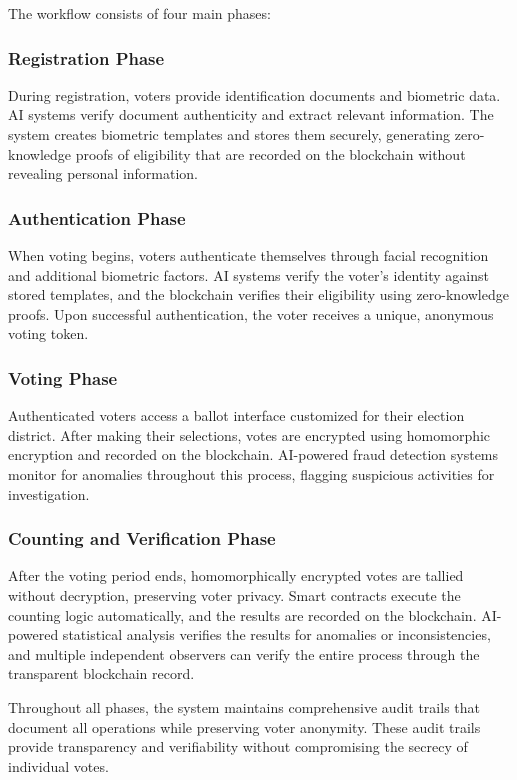 \documentclass[conference]{IEEEtran}
\begin{document}
The workflow consists of four main phases:

\subsubsection{Registration Phase}
During registration, voters provide identification documents and biometric data. AI systems verify document authenticity and extract relevant information. The system creates biometric templates and stores them securely, generating zero-knowledge proofs of eligibility that are recorded on the blockchain without revealing personal information.

\subsubsection{Authentication Phase}
When voting begins, voters authenticate themselves through facial recognition and additional biometric factors. AI systems verify the voter's identity against stored templates, and the blockchain verifies their eligibility using zero-knowledge proofs. Upon successful authentication, the voter receives a unique, anonymous voting token.

\subsubsection{Voting Phase}
Authenticated voters access a ballot interface customized for their election district. After making their selections, votes are encrypted using homomorphic encryption and recorded on the blockchain. AI-powered fraud detection systems monitor for anomalies throughout this process, flagging suspicious activities for investigation.

\subsubsection{Counting and Verification Phase}
After the voting period ends, homomorphically encrypted votes are tallied without decryption, preserving voter privacy. Smart contracts execute the counting logic automatically, and the results are recorded on the blockchain. AI-powered statistical analysis verifies the results for anomalies or inconsistencies, and multiple independent observers can verify the entire process through the transparent blockchain record.

Throughout all phases, the system maintains comprehensive audit trails that document all operations while preserving voter anonymity. These audit trails provide transparency and verifiability without compromising the secrecy of individual votes.
\end{document}
